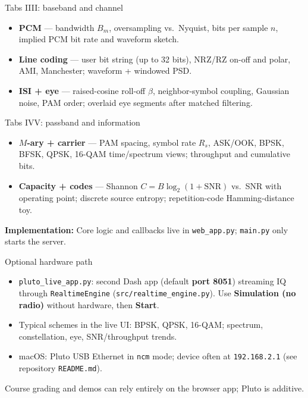 \documentclass[aspectratio=169, 12pt]{beamer}
\begin{document}
\begin{frame}{Tabs I\textemdash III: baseband and channel}
\small
\begin{itemize}
    \item \textbf{PCM} --- bandwidth $B_m$, oversampling vs.\ Nyquist, bits per sample $n$, implied PCM bit rate and waveform sketch.
    \item \textbf{Line coding} --- user bit string (up to 32 bits), NRZ/RZ on-off and polar, AMI, Manchester; waveform + windowed PSD.
    \item \textbf{ISI + eye} --- raised-cosine roll-off $\beta$, neighbor-symbol coupling, Gaussian noise, PAM order; overlaid eye segments after matched filtering.
\end{itemize}
\end{frame}

\begin{frame}{Tabs IV\textemdash V: passband and information}
\small
\begin{itemize}
    \item \textbf{$M$-ary + carrier} --- PAM spacing, symbol rate $R_s$, ASK/OOK, BPSK, BFSK, QPSK, 16-QAM time/spectrum views; throughput and cumulative bits.
    \item \textbf{Capacity + codes} --- Shannon $C=B\log_2(1+\mathrm{SNR})$ vs.\ SNR with operating point; discrete source entropy; repetition-code Hamming-distance toy.
\end{itemize}
\vfill
{\small\color{SlideMuted}\textbf{Implementation:} Core logic and callbacks live in \texttt{web\_app.py}; \texttt{main.py} only starts the server.\par}
\end{frame}

\begin{frame}{Optional hardware path}
\begin{itemize}
    \item \texttt{pluto\_live\_app.py}: second Dash app (default \textbf{port 8051}) streaming IQ through \texttt{RealtimeEngine} (\texttt{src/realtime\_engine.py}). Use \textbf{Simulation (no radio)} without hardware, then \textbf{Start}.
    \item Typical schemes in the live UI: BPSK, QPSK, 16-QAM; spectrum, constellation, eye, SNR/throughput trends.
    \item macOS: Pluto USB Ethernet in \texttt{ncm} mode; device often at \texttt{192.168.2.1} (see repository \texttt{README.md}).
\end{itemize}
\vfill
{\small\color{SlideMuted}Course grading and demos can rely entirely on the browser app; Pluto is additive.\par}
\end{frame}
\end{document}
